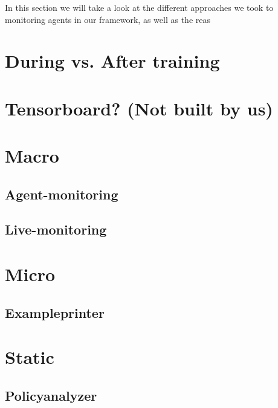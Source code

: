 \begin{jointwork}
	In this section we will take a look at the different approaches we took to monitoring agents in our framework, as well as the reas
\end{jointwork}

\section{During vs. After training}
\section{Tensorboard? (Not built by us)}
\section{Macro}
\subsection{Agent-monitoring}
\subsection{Live-monitoring}
\section{Micro}
\subsection{Exampleprinter}
\section{Static}
\subsection{Policyanalyzer}
